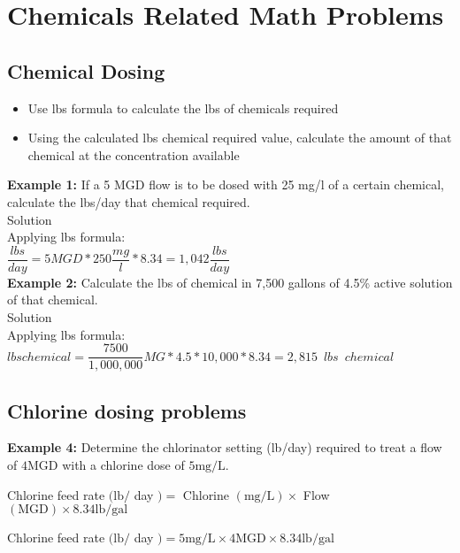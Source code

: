 \documentclass{article}
\begin{document}
\section*{Chemicals Related Math Problems}
\subsection*{Chemical Dosing}

\begin{itemize}
\item Use lbs formula to calculate the lbs of chemicals required\\
\item Using the calculated lbs chemical required value, calculate the amount of that chemical at the concentration available
\end{itemize}

\textbf{Example 1:} If a 5 MGD flow is to be dosed with 25 mg/l of a certain chemical, calculate the lbs/day that chemical required.\\

Solution\\

Applying lbs formula:\\
$\dfrac{lbs}{day}=5 MGD *250\dfrac{mg}{l}*8.34 = \boxed{1,042\dfrac{lbs}{day}}$
\\
\vspace{6pt}
\textbf{Example 2:} Calculate the lbs of chemical in 7,500 gallons of 4.5\% active solution of that chemical.\\
Solution\\
Applying lbs formula:\\
$lbs chemical = \dfrac{7500}{1,000,000}MG * 4.5*10,000 *8.34 = \boxed{2,815 \enspace lbs \enspace chemical}$\\

\subsection*{Chlorine dosing problems}
\textbf{Example 4:} Determine the chlorinator setting (lb/day) required to treat a flow of $4 \mathrm{MGD}$ with a chlorine dose of $5 \mathrm{mg} / \mathrm{L}$.

Chlorine feed rate $(\mathrm{lb} /$ day $)=$ Chlorine $(\mathrm{mg} / \mathrm{L}) \times$ Flow $(\mathrm{MGD}) \times 8.34 \mathrm{lb} / \mathrm{gal}$

Chlorine feed rate $(\mathrm{lb} /$ day $)=5 \mathrm{mg} / \mathrm{L} \times 4 \mathrm{MGD} \times 8.34 \mathrm{lb} / \mathrm{gal}$
\end{document}
